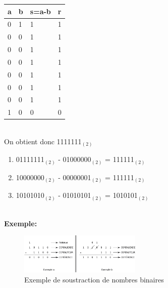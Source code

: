 \begin{Exercice}[15 minutes]
\begin{solution}
\begin{tabular}{| C{0.1\textwidth} | C{0.1\textwidth} | C{0.1\textwidth} | C{0.1\textwidth} |} 
            \hline
            \textbf{a} & \textbf{b} & \textbf{s=a-b} & \textbf{r}\\ [0.5ex]
             & 1 & 1 & 1 \\ [0.5ex] 
             & 0 & 1 & 1 \\ [0.5ex] 
             & 0 & 1 & 1 \\ [0.5ex] 
             & 0 & 1 & 1 \\ [0.5ex] 
             & 0 & 1 & 1 \\ [0.5ex] 
             & 0 & 1 & 1 \\ [0.5ex] 
             & 0 & 1 & 1 \\ [0.5ex] 
             & 0 & 0 & 0 \\ [0.5ex] 
            \hline
        \end{tabular} \\
 		
 		On obtient donc 1111111$_{(2)}$ \\
 		
 		\begin{enumerate}
        \item 01111111$_{(2)}$ - 01000000$_{(2)}$ = 111111$_{(2)}$
        \item 10000000$_{(2)}$ - 00000001$_{(2)}$ = 111111$_{(2)}$
        \item 10101010$_{(2)}$ - 01010101$_{(2)}$ = 1010101$_{(2)}$
    \end{enumerate}
    \end{solution}

    \textbf{\\ \faTerminal  Exemple:}
        \begin{figure}[h]
            \centering
            \includegraphics[width=0.52\textwidth]{img/substract.png}
            \caption{Exemple de soustraction de nombres binaires}
        \end{figure}

\end{Exercice}
\newpage
